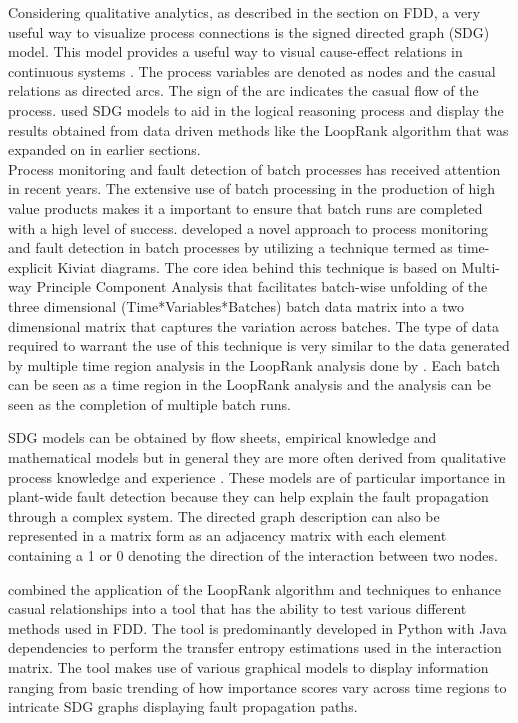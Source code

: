 Considering qualitative analytics, as described in the section on FDD, a very useful way to visualize process connections is the signed directed graph (SDG) model. This model provides a useful way to visual cause-effect relations in continuous systems \cite{yang2010qualitative}. The process variables are denoted as nodes and the casual relations as directed arcs. The sign of the arc indicates the casual flow of the process. \cite{streicher2019plant} used SDG models to aid in the logical reasoning process and display the results obtained from data driven methods like the LoopRank algorithm that was expanded on in earlier sections.\\

Process monitoring and fault detection of batch processes has received attention in recent years. The extensive use of batch processing in the production of high value products makes it a important to ensure that batch runs are completed with a high level of success. \cite{wang2018geometric} developed a novel approach to process monitoring and fault detection in batch processes by utilizing a technique termed as time-explicit Kiviat diagrams. The core idea behind this technique is based on Multi-way Principle Component Analysis that facilitates batch-wise unfolding of the three dimensional (Time*Variables*Batches) batch data matrix into a two dimensional matrix that captures the variation across batches. The type of data required to warrant the use of this technique is very similar to the data generated by multiple time region analysis in the LoopRank analysis done by \cite{streicher2019plant}. Each batch can be seen as a time region in the LoopRank analysis and the analysis can be seen as the completion of multiple batch runs.

SDG models can be obtained by flow sheets, empirical knowledge and mathematical models but in general they are more often derived from qualitative process knowledge and experience \cite{yang2010qualitative}. These models are of particular importance in plant-wide fault detection because they can help explain the fault propagation through a complex system. The directed graph description can also be represented in a matrix form as an adjacency matrix with each element containing a 1 or 0 denoting the direction of the interaction between two nodes.

\cite{streicher2019plant} combined the application of the LoopRank algorithm and techniques to enhance casual relationships into a tool that has the ability to test various different methods used in FDD. The tool is predominantly developed in Python with Java dependencies to perform the transfer entropy estimations used in the interaction matrix. The tool makes use of various graphical models to display information ranging from basic trending of how importance scores vary across time regions to intricate SDG graphs displaying fault propagation paths.




